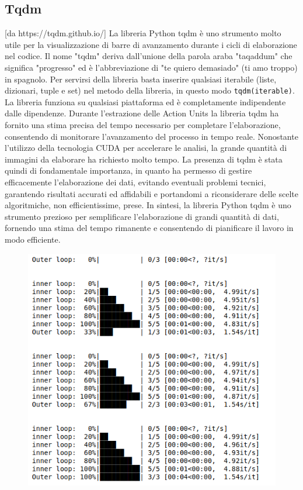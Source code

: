 \subsection{Tqdm}
[da https://tqdm.github.io/]
La libreria Python tqdm è uno strumento molto utile per la visualizzazione di barre di avanzamento durante i cicli di elaborazione nel codice. 
Il nome "tqdm" deriva dall'unione della parola araba "taqaddum" che significa "progresso" ed è l'abbreviazione di "te quiero demasiado" (ti amo troppo) in spagnolo. 
Per servirsi della libreria basta inserire qualsiasi iterabile (liste, dizionari, tuple e set) nel metodo della libreria, in questo modo \texttt{tqdm(iterable)}. 
La libreria funziona su qualsiasi piattaforma ed è completamente indipendente dalle dipendenze. 
Durante l'estrazione delle Action Units la libreria tqdm ha fornito una stima precisa del tempo necessario per completare l'elaborazione, consentendo di monitorare l'avanzamento del processo in tempo reale. 
Nonostante l'utilizzo della tecnologia CUDA per accelerare le analisi, la grande quantità di immagini da elaborare ha richiesto molto tempo. 
La presenza di tqdm è stata quindi di fondamentale importanza, in quanto ha permesso di gestire efficacemente l'elaborazione dei dati, evitando eventuali problemi tecnici, garantendo risultati accurati ed affidabili e portandomi a riconsiderare delle scelte algoritmiche, non efficientissime, prese. 
In sintesi, la libreria Python tqdm è uno strumento prezioso per semplificare l'elaborazione di grandi quantità di dati, fornendo una stima del tempo rimanente e consentendo di pianificare il lavoro in modo efficiente.

\begin{figure}
    \begin{center}    
        \includegraphics[width=0.9\linewidth]{images/image5.png}
    \end{center}
\end{figure}

